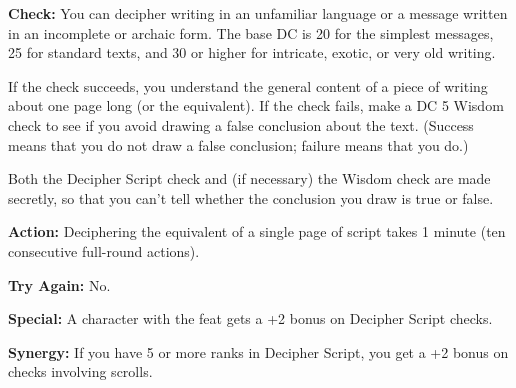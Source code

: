 
\textbf{Check:} You can decipher writing in an unfamiliar language or a message 
written in an incomplete or archaic form. The base DC is 20 for the simplest messages, 
25 for standard texts, and 30 or higher for intricate, exotic, or very old writing.

If the check succeeds, you understand the general content of a piece of writing 
about one page long (or the equivalent). If the check fails, make a DC 5 Wisdom 
check to see if you avoid drawing a false conclusion about the text. (Success means 
that you do not draw a false conclusion; failure means that you do.)

Both the Decipher Script check and (if necessary) the Wisdom check are made secretly, 
so that you can't tell whether the conclusion you draw is true or false.

\textbf{Action:} Deciphering the equivalent of a single page of script takes 1 
minute (ten consecutive full-round actions).

\textbf{Try Again:} No.

\textbf{Special:} A character with the  feat gets a +2 bonus on Decipher 
Script checks.

\textbf{Synergy:} If you have 5 or more ranks in Decipher Script, you get a +2 
bonus on  checks involving scrolls.
